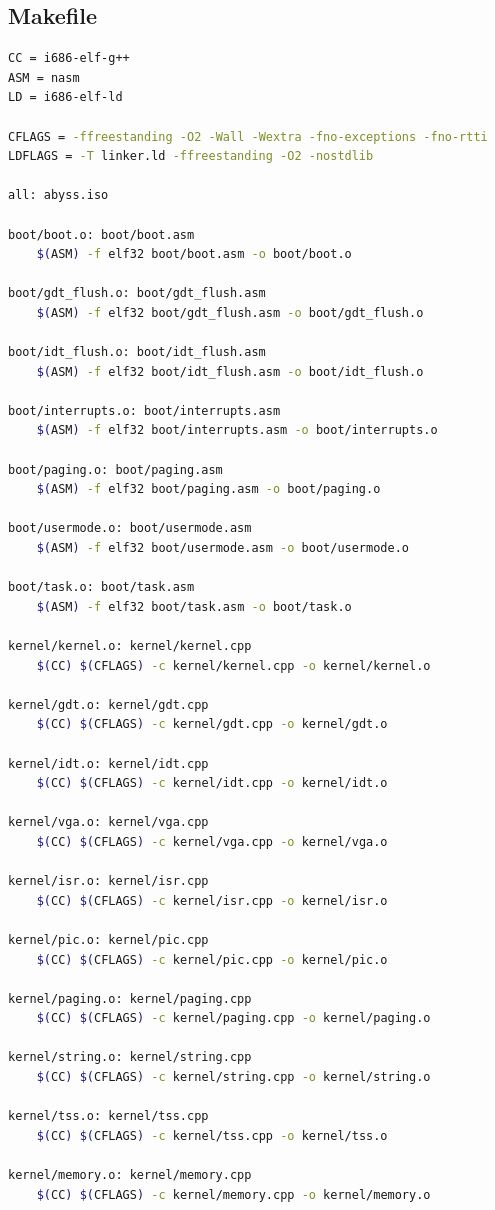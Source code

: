 \documentclass[12pt,a4paper]{report}
\begin{document}
\subsection{Makefile}
\begin{lstlisting}[language={bash}]
CC = i686-elf-g++
ASM = nasm
LD = i686-elf-ld

CFLAGS = -ffreestanding -O2 -Wall -Wextra -fno-exceptions -fno-rtti
LDFLAGS = -T linker.ld -ffreestanding -O2 -nostdlib

all: abyss.iso

boot/boot.o: boot/boot.asm
	$(ASM) -f elf32 boot/boot.asm -o boot/boot.o

boot/gdt_flush.o: boot/gdt_flush.asm
	$(ASM) -f elf32 boot/gdt_flush.asm -o boot/gdt_flush.o

boot/idt_flush.o: boot/idt_flush.asm
	$(ASM) -f elf32 boot/idt_flush.asm -o boot/idt_flush.o

boot/interrupts.o: boot/interrupts.asm
	$(ASM) -f elf32 boot/interrupts.asm -o boot/interrupts.o

boot/paging.o: boot/paging.asm
	$(ASM) -f elf32 boot/paging.asm -o boot/paging.o

boot/usermode.o: boot/usermode.asm
	$(ASM) -f elf32 boot/usermode.asm -o boot/usermode.o

boot/task.o: boot/task.asm
	$(ASM) -f elf32 boot/task.asm -o boot/task.o

kernel/kernel.o: kernel/kernel.cpp
	$(CC) $(CFLAGS) -c kernel/kernel.cpp -o kernel/kernel.o

kernel/gdt.o: kernel/gdt.cpp
	$(CC) $(CFLAGS) -c kernel/gdt.cpp -o kernel/gdt.o

kernel/idt.o: kernel/idt.cpp
	$(CC) $(CFLAGS) -c kernel/idt.cpp -o kernel/idt.o

kernel/vga.o: kernel/vga.cpp
	$(CC) $(CFLAGS) -c kernel/vga.cpp -o kernel/vga.o

kernel/isr.o: kernel/isr.cpp
	$(CC) $(CFLAGS) -c kernel/isr.cpp -o kernel/isr.o

kernel/pic.o: kernel/pic.cpp
	$(CC) $(CFLAGS) -c kernel/pic.cpp -o kernel/pic.o

kernel/paging.o: kernel/paging.cpp	
	$(CC) $(CFLAGS) -c kernel/paging.cpp -o kernel/paging.o

kernel/string.o: kernel/string.cpp
	$(CC) $(CFLAGS) -c kernel/string.cpp -o kernel/string.o

kernel/tss.o: kernel/tss.cpp
	$(CC) $(CFLAGS) -c kernel/tss.cpp -o kernel/tss.o

kernel/memory.o: kernel/memory.cpp
	$(CC) $(CFLAGS) -c kernel/memory.cpp -o kernel/memory.o


\end{lstlisting}
\end{document}
